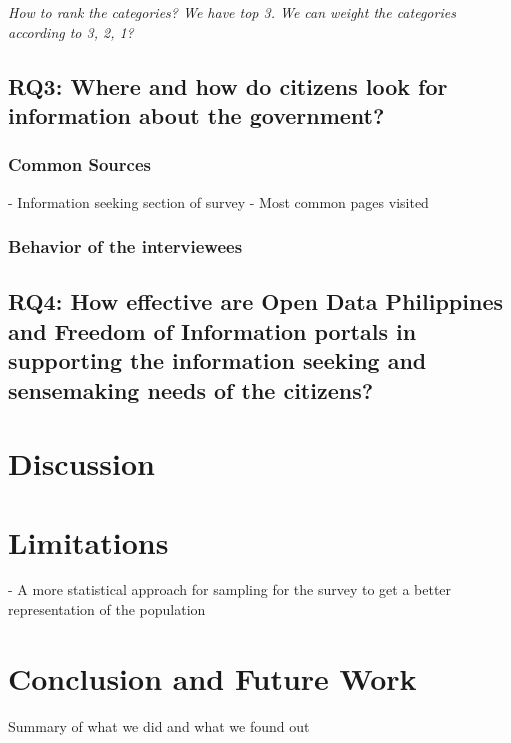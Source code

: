 \documentclass{sigchi}
\begin{document}
\textit{How to rank the categories? We have top 3. We can weight the categories according to 3, 2, 1?}

\subsection{RQ3: Where and how do citizens look for information about the government?}

\subsubsection{Common Sources}
- Information seeking section of survey
- Most common pages visited

\subsubsection{Behavior of the interviewees}

\subsection{RQ4: How effective are Open Data Philippines and Freedom of Information portals in supporting the information seeking and sensemaking needs of the citizens?}


\section{Discussion}

\section{Limitations}
- A more statistical approach for sampling for the survey to get a better representation of the population

\section{Conclusion and Future Work}
Summary of what we did and what we found out
\end{document}
